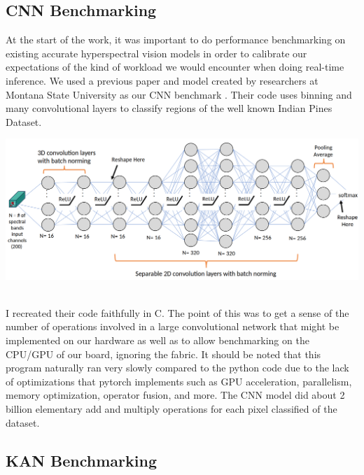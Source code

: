 \documentclass{article}
\begin{document}
\subsection{CNN Benchmarking}
At the start of the work, it was important to do performance benchmarking on existing accurate hyperspectral vision models in order to calibrate our expectations of the kind of workload we would encounter when doing real-time inference. We used a previous paper and model created by researchers at Montana State University as our CNN benchmark \cite{Morales_2021} \cite{rs13183649}. Their code uses binning and many convolutional layers to classify regions of the well known Indian Pines Dataset.\\
\centerline{\includegraphics[scale=0.2]{cnn_arch.png}}\\ %
I recreated their code faithfully in C. The point of this was to get a sense of the number of operations involved in a large convolutional network that might be implemented on our hardware as well as to allow benchmarking on the CPU/GPU of our board, ignoring the fabric. It should be noted that this program naturally ran very slowly compared to the python code due to the lack of optimizations that pytorch implements such as GPU acceleration, parallelism, memory optimization, operator fusion, and more. The CNN model did about 2 billion elementary add and multiply operations for each pixel classified of the dataset.

\subsection{KAN Benchmarking}
\end{document}

